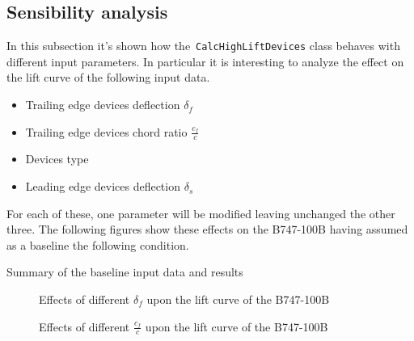 \subsection{Sensibility analysis}
%
In this subsection it's shown how the~\lstinline[language=Java]!CalcHighLiftDevices! class behaves with different input parameters. In particular it is interesting to analyze the effect on the lift curve of the following input data.
%
\begin{itemize}
\item Trailing edge devices deflection $\delta_f$
\item Trailing edge devices chord ratio $\frac{c_f}{c}$ 
\item Devices type 
\item Leading edge devices deflection $\delta_s$
\end{itemize}
%
For each of these, one parameter will be modified leaving unchanged the other three. The following figures show these effects on the B747-100B having assumed as a baseline the following condition.
%
\begin{table}[H]
\caption{Summary of the baseline input data and results}
\end{table}
%
\begin{figure}[H]
\centering

\caption{Effects of different $\delta_f$ upon the lift curve of the B747-100B}
\end{figure}
%
\begin{figure}[H]
\centering

\caption{Effects of different $\frac{c_f}{c}$ upon the lift curve of the B747-100B}
\end{figure}
